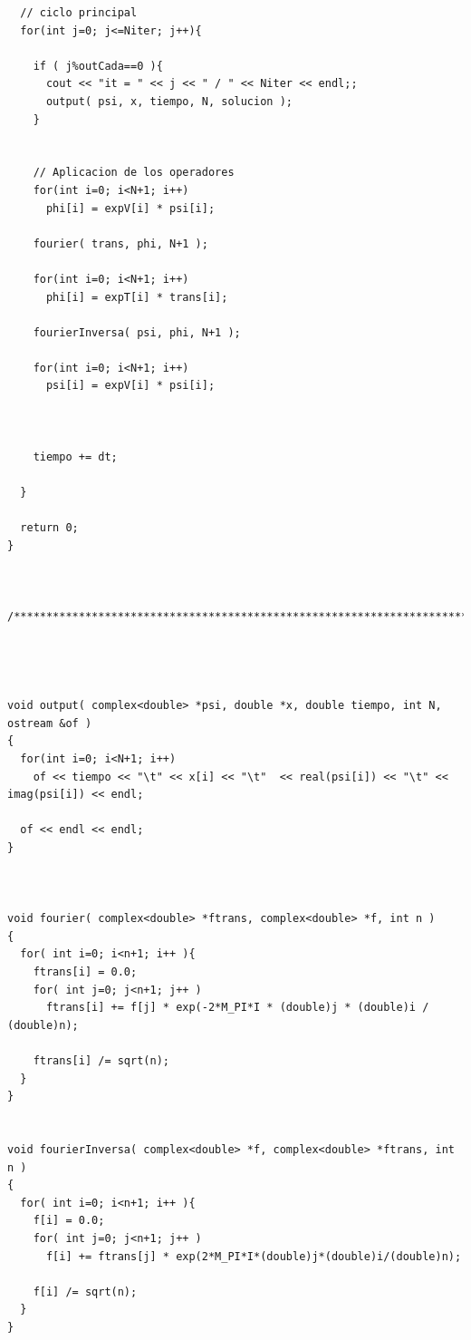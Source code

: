 \begin{lstlisting}
  // ciclo principal
  for(int j=0; j<=Niter; j++){

    if ( j%outCada==0 ){
      cout << "it = " << j << " / " << Niter << endl;;
      output( psi, x, tiempo, N, solucion );
    }


    // Aplicacion de los operadores
    for(int i=0; i<N+1; i++)
      phi[i] = expV[i] * psi[i];

    fourier( trans, phi, N+1 );

    for(int i=0; i<N+1; i++)
      phi[i] = expT[i] * trans[i];

    fourierInversa( psi, phi, N+1 );

    for(int i=0; i<N+1; i++)
      psi[i] = expV[i] * psi[i];



    tiempo += dt;

  }

  return 0;
}



/***********************************************************************/




void output( complex<double> *psi, double *x, double tiempo, int N, ostream &of )
{
  for(int i=0; i<N+1; i++)
    of << tiempo << "\t" << x[i] << "\t"  << real(psi[i]) << "\t" << imag(psi[i]) << endl;

  of << endl << endl;
}



void fourier( complex<double> *ftrans, complex<double> *f, int n )
{
  for( int i=0; i<n+1; i++ ){
    ftrans[i] = 0.0;
    for( int j=0; j<n+1; j++ )
      ftrans[i] += f[j] * exp(-2*M_PI*I * (double)j * (double)i / (double)n);

    ftrans[i] /= sqrt(n);
  }
}


void fourierInversa( complex<double> *f, complex<double> *ftrans, int n )
{
  for( int i=0; i<n+1; i++ ){
    f[i] = 0.0;
    for( int j=0; j<n+1; j++ )
      f[i] += ftrans[j] * exp(2*M_PI*I*(double)j*(double)i/(double)n);

    f[i] /= sqrt(n);
  }
}

\end{lstlisting}



















